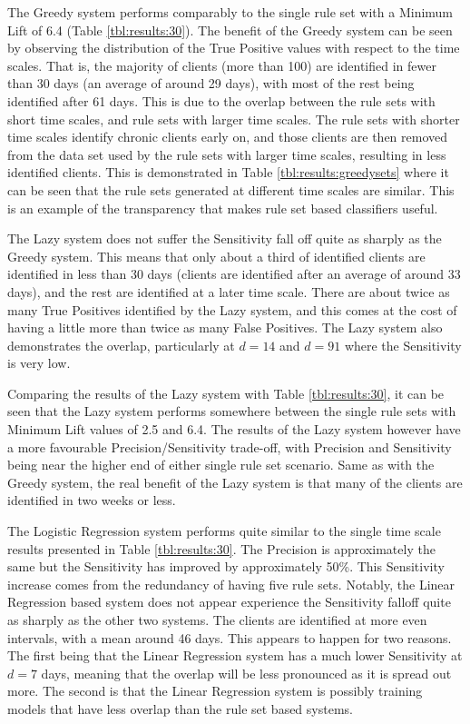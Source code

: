 The Greedy system performs comparably to the single rule set with a Minimum Lift of 6.4 (Table \ref{tbl:results:30}). The benefit of the Greedy system can be seen by observing the distribution of the True Positive values with respect to the time scales. That is, the majority of clients (more than 100) are identified in fewer than 30 days (an average of around 29 days), with most of the rest being identified after 61 days. This is due to the overlap between the rule sets with short time scales, and rule sets with larger time scales. The rule sets with shorter time scales identify chronic clients early on, and those clients are then removed from the data set used by the rule sets with larger time scales, resulting in less identified clients. This is demonstrated in Table \ref{tbl:results:greedysets} where it can be seen that the rule sets generated at different time scales are similar. This is an example of the transparency that makes rule set based classifiers useful.

The Lazy system does not suffer the Sensitivity fall off quite as sharply as the Greedy system. This means that only about a third of identified clients are identified in less than 30 days (clients are identified after an average of around 33 days), and the rest are identified at a later time scale. There are about twice as many True Positives identified by the Lazy system, and this comes at the cost of having a little more than twice as many False Positives. The Lazy system also demonstrates the overlap, particularly at $d=14$ and $d=91$ where the Sensitivity is very low.

Comparing the results of the Lazy system with Table \ref{tbl:results:30}, it can be seen that the Lazy system performs somewhere between the single rule sets with Minimum Lift values of 2.5 and 6.4. The results of the Lazy system however have a more favourable Precision/Sensitivity trade-off, with Precision and Sensitivity being near the higher end of either single rule set scenario. Same as with the Greedy system, the real benefit of the Lazy system is that many of the clients are identified in two weeks or less.

The Logistic Regression system performs quite similar to the single time scale results presented in Table \ref{tbl:results:30}. The Precision is approximately the same but the Sensitivity has improved by approximately 50\%. This Sensitivity increase comes from the redundancy of having five rule sets. Notably, the Linear Regression based system does not appear experience the Sensitivity falloff quite as sharply as the other two systems. The clients are identified at more even intervals, with a mean around 46 days. This appears to happen for two reasons. The first being that the Linear Regression system has a much lower Sensitivity at $d=7$ days, meaning that the overlap will be less pronounced as it is spread out more. The second is that the Linear Regression system is possibly training models that have less overlap than the rule set based systems. 

